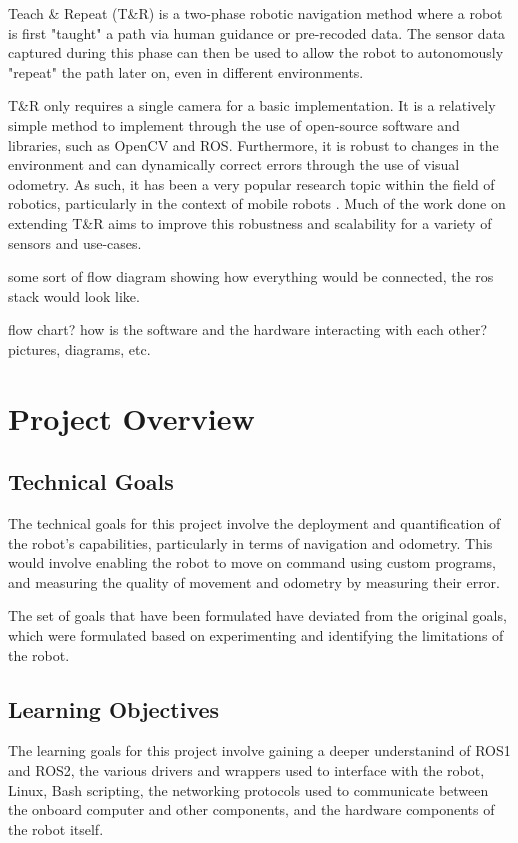 \documentclass[a4paper, 12pt]{article}
\newif\ifshownotes
\newcommand{\notes}[1]{\ifshownotes\textcolor{blue}{#1}\fi}
\begin{document}
    Teach \& Repeat (T\&R) \notes{[cite]} is a two-phase robotic navigation method where a robot is first "taught" a path via human guidance or pre-recoded data. The sensor data captured during this phase can then be used to allow the robot to autonomously "repeat" the path later on, even in different environments.

    T\&R only requires a single camera for a basic implementation. It is a relatively simple method to implement through the use of open-source software and libraries, such as OpenCV and ROS. Furthermore, it is robust to changes in the environment and can dynamically correct errors through the use of visual odometry. As such, it has been a very popular research topic within the field of robotics, particularly in the context of mobile robots \notes{[cite]}. Much of the work done on extending T\&R aims to improve this robustness and scalability for a variety of sensors and use-cases. 

    some sort of flow diagram showing how everything would be connected, the ros stack would look like.



    flow chart? how is the software and the hardware interacting with each other? pictures, diagrams, etc. 

    \pagebreak
    
    \section{Project Overview}

    

    \subsection{Technical Goals}

    The technical goals for this project involve the deployment and quantification of the robot's capabilities, particularly in terms of navigation and odometry. This would involve enabling the robot to move on command using custom programs, and measuring the quality of movement and odometry by measuring their error. 

    
    The set of goals that have been formulated have deviated from the original goals, which were formulated based on experimenting and identifying the limitations of the robot. 

    \subsection{Learning Objectives}
    The learning goals for this project involve gaining a deeper understanind of ROS1 and ROS2, the various drivers and wrappers used to interface with the robot, Linux, Bash scripting, the networking protocols used to communicate between the onboard computer and other components, and the hardware components of the robot itself. 
\end{document}
